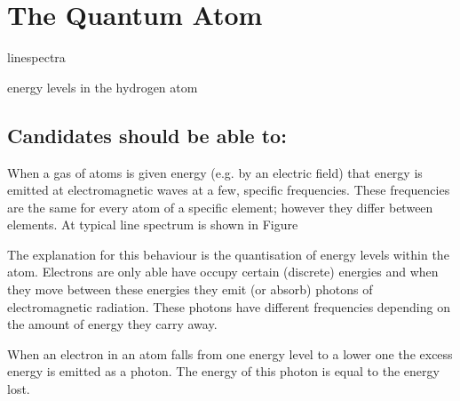 \documentclass[revision-guide.tex]{subfiles}
\begin{document}
\chapter{The Quantum Atom}
\begin{content}
\item linespectra
\item energy levels in the hydrogen atom
\end{content}
\section*{Candidates should be able to:}


When a gas of atoms is given energy (e.g. by an electric field) that energy is emitted at electromagnetic waves at a few, specific frequencies. These frequencies are the same for every atom of a specific element; however they differ between elements. At typical line spectrum is shown in Figure %

The explanation for this behaviour is the quantisation of energy levels within the atom. Electrons are only able have occupy certain (discrete) energies and when they move between these energies they emit (or absorb) photons of electromagnetic radiation. These photons have different frequencies depending on the amount of energy they carry away.


When an electron in an atom falls from one energy level to a lower one the excess energy is emitted as a photon. The energy of this photon is equal to the energy lost.
\end{document}
